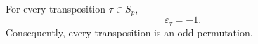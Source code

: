For every transposition $\tau \in S_p$,
$$\varepsilon_\tau = -1.$$
Consequently, every transposition is an odd permutation.
